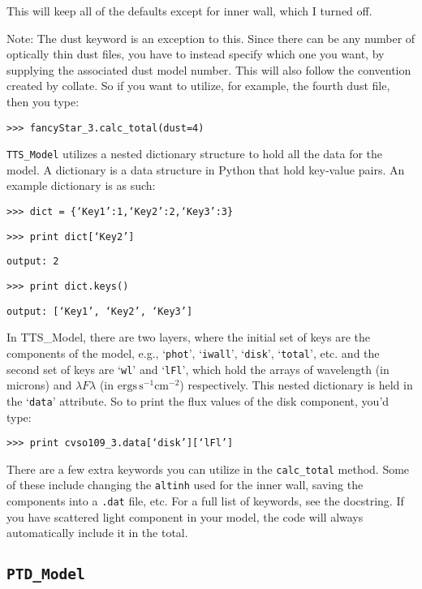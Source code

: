 \documentclass{article}
\begin{document}
This will keep all of the defaults except for inner wall, which I turned off. 
 
Note: The dust keyword is an exception to this. Since there can be any number of optically thin dust files, you have to instead specify which one you want, by supplying the associated dust model number. This will also follow the convention created by collate. So if you want to utilize, for example, the fourth dust file, then you type: 

\vspace{2mm}
\texttt{>>> fancyStar\_3.calc\_total(dust=4)}
\vspace{2mm}
 
\texttt{TTS\_Model} utilizes a nested dictionary structure to hold all the data for the model. A dictionary is a data structure in Python that hold key-value pairs. An example dictionary is as such: 
 
\vspace{2mm}
\texttt{>>> dict = \{‘Key1’:1,‘Key2’:2,‘Key3’:3\}}

\texttt{>>> print dict[‘Key2’]}

\texttt{output: 2 }

\texttt{>>> print dict.keys() }

\texttt{output: [‘Key1’, ‘Key2’, ‘Key3’] }
\vspace{2mm}
 
In TTS\_Model, there are two layers, where the initial set of keys are the components of the model, e.g., `\texttt{phot}', `\texttt{iwall}', `\texttt{disk}', `\texttt{total}', etc. and the second set of keys are `\texttt{wl}' and `\texttt{lFl}’, which hold the arrays of wavelength (in microns) and $\lambda F\lambda $ (in $\mbox{ergs}\, \mbox{s}^{-1} \mbox{cm}^{-2}$) respectively. This nested dictionary is held in the ‘\texttt{data}’ attribute. So to print the flux values of the disk component, you’d type: 
 
\vspace{2mm}
\texttt{>>> print cvso109\_3.data[‘disk’][‘lFl’]}
\vspace{2mm}

There are a few extra keywords you can utilize in the \texttt{calc\_total} method. Some of these include changing the \texttt{altinh} used for the inner wall, saving the components into a \texttt{.dat} file, etc. For a full list of keywords, see the docstring. If you have scattered light component in your model, the code will always automatically include it in the total. 
 
\subsection{\texttt{PTD\_Model}}
 
\end{document}
